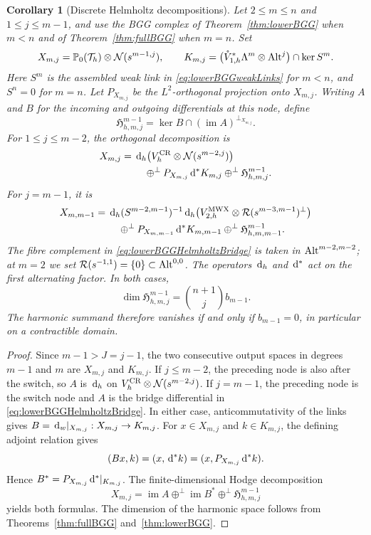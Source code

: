 \documentclass[10pt]{amsart}
\numberwithin{equation}{section}
\newtheorem{corollary}[theorem]{Corollary}
\newcommand{\dd}{\,{\rm d}}
\begin{document}
\begin{corollary}[Discrete Helmholtz decompositions]\label{cor:MWXBGGHelmholtz}
Let $2\leq m\leq n$ and $1\leq j\leq m-1$, and use the BGG complex of
Theorem~\ref{thm:lowerBGG} when $m<n$ and of Theorem~\ref{thm:fullBGG}
when $m=n$. Set
\[
X_{m,j}=\mathbb P_0(\mathcal T_h)\otimes\mathcal N(s^{m-1,j}),\qquad
K_{m,j}=\bigl(\mathring V_{1,h}^{*}\Lambda^m\otimes{\rm Alt}^j\bigr)
\cap\ker S^m.
\]
Here $S^m$ is the assembled weak link in
\eqref{eq:lowerBGGweakLinks} for $m<n$, and $S^n=0$ for $m=n$.
Let $P_{X_{m,j}}$ be the $L^2$-orthogonal projection onto $X_{m,j}$.
Writing $A$ and $B$ for the incoming and outgoing differentials at
this node, define
\[
\mathfrak H_{h,m,j}^{m-1}
=\ker B\cap(\operatorname{im}A)^{\perp_{X_{m,j}}}.
\]
For $1\leq j\leq m-2$, the orthogonal decomposition is
\begin{equation}\label{eq:lowerBGGHelmholtzFirst}
\begin{aligned}
X_{m,j}={}&\dd_h\bigl(V_h^{\rm CR}\otimes\mathcal N(s^{m-2,j})\bigr)\\
&\quad\oplus^\perp P_{X_{m,j}}\dd^*K_{m,j}
\oplus^\perp\mathfrak H_{h,m,j}^{m-1}.
\end{aligned}
\end{equation}
For $j=m-1$, it is
\begin{equation}\label{eq:lowerBGGHelmholtzBridge}
\begin{aligned}
X_{m,m-1}={}&\dd_h(S^{m-2,m-1})^{-1}\dd_h
\bigl(V_{2,h}^{\rm MWX}\otimes\mathcal R(s^{m-3,m-1})^\perp\bigr)\\
&\quad\oplus^\perp P_{X_{m,m-1}}\dd^*K_{m,m-1}
\oplus^\perp\mathfrak H_{h,m,m-1}^{m-1}.
\end{aligned}
\end{equation}
The fibre complement in \eqref{eq:lowerBGGHelmholtzBridge} is taken
in ${\rm Alt}^{m-2,m-2}$; at $m=2$ we set
$\mathcal R(s^{-1,1})=\{0\}\subset{\rm Alt}^{0,0}$.
The operators $\dd_h$ and $\dd^*$ act on the first alternating factor.
In both cases,
\[
\dim\mathfrak H_{h,m,j}^{m-1}=\binom{n+1}{j}b_{m-1}.
\]
The harmonic summand therefore vanishes if and only if $b_{m-1}=0$,
in particular on a contractible domain.
\end{corollary}
\begin{proof}
Since $m-1>J=j-1$, the two consecutive output spaces in degrees
$m-1$ and $m$ are $X_{m,j}$ and $K_{m,j}$.
If $j\leq m-2$, the preceding node is also after the switch, so $A$
is $\dd_h$ on $V_h^{\rm CR}\otimes\mathcal N(s^{m-2,j})$.
If $j=m-1$, the preceding node is the switch node and $A$ is the
bridge differential in \eqref{eq:lowerBGGHelmholtzBridge}.
In either case, anticommutativity of the links gives
$B=\dd_w|_{X_{m,j}}:X_{m,j}\to K_{m,j}$.
For $x\in X_{m,j}$ and $k\in K_{m,j}$, the defining adjoint relation gives
\[
(Bx,k)=(x,\dd^*k)=(x,P_{X_{m,j}}\dd^*k).
\]
Hence $B^*=P_{X_{m,j}}\dd^*|_{K_{m,j}}$. The finite-dimensional Hodge
decomposition
\[
X_{m,j}=\operatorname{im}A\oplus^\perp\operatorname{im}B^*
\oplus^\perp\mathfrak H_{h,m,j}^{m-1}
\]
yields both formulas. The dimension of the harmonic space follows from
Theorems~\ref{thm:fullBGG} and~\ref{thm:lowerBGG}.
\end{proof}
\end{document}
